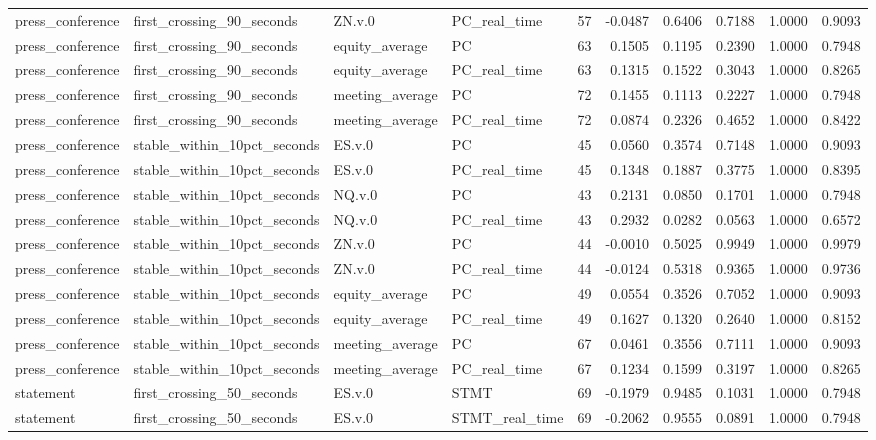 \begin{tabular}{llllrrrrrr}
press_conference & first_crossing_90_seconds & ZN.v.0 & PC_real_time & 57 & -0.0487 & 0.6406 & 0.7188 & 1.0000 & 0.9093 \\
press_conference & first_crossing_90_seconds & equity_average & PC & 63 & 0.1505 & 0.1195 & 0.2390 & 1.0000 & 0.7948 \\
press_conference & first_crossing_90_seconds & equity_average & PC_real_time & 63 & 0.1315 & 0.1522 & 0.3043 & 1.0000 & 0.8265 \\
press_conference & first_crossing_90_seconds & meeting_average & PC & 72 & 0.1455 & 0.1113 & 0.2227 & 1.0000 & 0.7948 \\
press_conference & first_crossing_90_seconds & meeting_average & PC_real_time & 72 & 0.0874 & 0.2326 & 0.4652 & 1.0000 & 0.8422 \\
press_conference & stable_within_10pct_seconds & ES.v.0 & PC & 45 & 0.0560 & 0.3574 & 0.7148 & 1.0000 & 0.9093 \\
press_conference & stable_within_10pct_seconds & ES.v.0 & PC_real_time & 45 & 0.1348 & 0.1887 & 0.3775 & 1.0000 & 0.8395 \\
press_conference & stable_within_10pct_seconds & NQ.v.0 & PC & 43 & 0.2131 & 0.0850 & 0.1701 & 1.0000 & 0.7948 \\
press_conference & stable_within_10pct_seconds & NQ.v.0 & PC_real_time & 43 & 0.2932 & 0.0282 & 0.0563 & 1.0000 & 0.6572 \\
press_conference & stable_within_10pct_seconds & ZN.v.0 & PC & 44 & -0.0010 & 0.5025 & 0.9949 & 1.0000 & 0.9979 \\
press_conference & stable_within_10pct_seconds & ZN.v.0 & PC_real_time & 44 & -0.0124 & 0.5318 & 0.9365 & 1.0000 & 0.9736 \\
press_conference & stable_within_10pct_seconds & equity_average & PC & 49 & 0.0554 & 0.3526 & 0.7052 & 1.0000 & 0.9093 \\
press_conference & stable_within_10pct_seconds & equity_average & PC_real_time & 49 & 0.1627 & 0.1320 & 0.2640 & 1.0000 & 0.8152 \\
press_conference & stable_within_10pct_seconds & meeting_average & PC & 67 & 0.0461 & 0.3556 & 0.7111 & 1.0000 & 0.9093 \\
press_conference & stable_within_10pct_seconds & meeting_average & PC_real_time & 67 & 0.1234 & 0.1599 & 0.3197 & 1.0000 & 0.8265 \\
statement & first_crossing_50_seconds & ES.v.0 & STMT & 69 & -0.1979 & 0.9485 & 0.1031 & 1.0000 & 0.7948 \\
statement & first_crossing_50_seconds & ES.v.0 & STMT_real_time & 69 & -0.2062 & 0.9555 & 0.0891 & 1.0000 & 0.7948 \\

\end{tabular}
